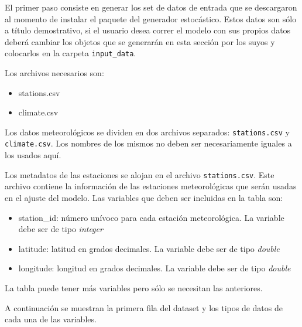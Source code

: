 \documentclass[
  12pt]{article}
\newenvironment{Shaded}{}{}
\newcommand{\CommentTok}[1]{\textcolor[rgb]{0.38,0.63,0.69}{\textit{#1}}}
\newcommand{\DataTypeTok}[1]{\textcolor[rgb]{0.56,0.13,0.00}{#1}}
\newcommand{\KeywordTok}[1]{\textcolor[rgb]{0.00,0.44,0.13}{\textbf{#1}}}
\newcommand{\NormalTok}[1]{#1}
\newcommand{\OperatorTok}[1]{\textcolor[rgb]{0.40,0.40,0.40}{#1}}
\newcommand{\StringTok}[1]{\textcolor[rgb]{0.25,0.44,0.63}{#1}}
\providecommand{\tightlist}{%
  \setlength{\itemsep}{0pt}\setlength{\parskip}{0pt}}
\begin{document}
El primer paso consiste en generar los set de datos de entrada que se descargaron al momento de instalar el paquete del generador estocástico. Estos datos son sólo a título demostrativo, si el usuario desea correr el modelo con sus propios datos deberá cambiar los objetos que se generarán en esta sección por los suyos y colocarlos en la carpeta \texttt{input\_data}.

Los archivos necesarios son:

\begin{itemize}
\tightlist
\item
  stations.csv
\item
  climate.csv
\end{itemize}

Los datos meteorológicos se dividen en dos archivos separados: \texttt{stations.csv} y \texttt{climate.csv}. Los nombres de los mismos no deben ser necesariamente iguales a los usados aquí.

Los metadatos de las estaciones se alojan en el archivo \texttt{stations.csv}. Este archivo contiene la información de las estaciones meteorológicas que serán usadas en el ajuste del modelo. Las variables que deben ser incluidas en la tabla son:

\begin{itemize}
\tightlist
\item
  station\_id: número unívoco para cada estación meteorológica. La variable debe ser de tipo \emph{integer}
\item
  latitude: latitud en grados decimales. La variable debe ser de tipo \emph{double}
\item
  longitude: longitud en grados decimales. La variable debe ser de tipo \emph{double}
\end{itemize}

La tabla puede tener más variables pero sólo se necesitan las anteriores.

A continuación se muestran la primera fila del dataset y los tipos de datos de cada una de las variables.

\begin{Shaded}
\end{Shaded}
\end{document}
